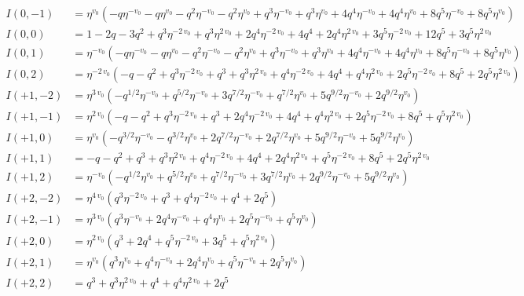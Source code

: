 \documentclass{article}
\begin{document}
\begin{align*}
I(0, -1) &= \eta^{v_{0}} \left( -q \eta^{-v_{0}} - q \eta^{v_{0}} - q^{2} \eta^{-v_{0}} - q^{2} \eta^{v_{0}} + q^{3} \eta^{-v_{0}} + q^{3} \eta^{v_{0}} + 4 q^{4} \eta^{-v_{0}} + 4 q^{4} \eta^{v_{0}} + 8 q^{5} \eta^{-v_{0}} + 8 q^{5} \eta^{v_{0}} \right) \\
I(0, 0) &= 1 - 2 q - 3 q^{2} + q^{3} \eta^{-2 \, v_{0}} + q^{3} \eta^{2 \, v_{0}} + 2 q^{4} \eta^{-2 \, v_{0}} + 4 q^{4} + 2 q^{4} \eta^{2 \, v_{0}} + 3 q^{5} \eta^{-2 \, v_{0}} + 12 q^{5} + 3 q^{5} \eta^{2 \, v_{0}} \\
I(0, 1) &= \eta^{-v_{0}} \left( -q \eta^{-v_{0}} - q \eta^{v_{0}} - q^{2} \eta^{-v_{0}} - q^{2} \eta^{v_{0}} + q^{3} \eta^{-v_{0}} + q^{3} \eta^{v_{0}} + 4 q^{4} \eta^{-v_{0}} + 4 q^{4} \eta^{v_{0}} + 8 q^{5} \eta^{-v_{0}} + 8 q^{5} \eta^{v_{0}} \right) \\
I(0, 2) &= \eta^{-2 \, v_{0}} \left( -q - q^{2} + q^{3} \eta^{-2 \, v_{0}} + q^{3} + q^{3} \eta^{2 \, v_{0}} + q^{4} \eta^{-2 \, v_{0}} + 4 q^{4} + q^{4} \eta^{2 \, v_{0}} + 2 q^{5} \eta^{-2 \, v_{0}} + 8 q^{5} + 2 q^{5} \eta^{2 \, v_{0}} \right) \\
I(+1, -2) &= \eta^{3 \, v_{0}} \left( -q^{1/2} \eta^{-v_{0}} + q^{5/2} \eta^{-v_{0}} + 3 q^{7/2} \eta^{-v_{0}} + q^{7/2} \eta^{v_{0}} + 5 q^{9/2} \eta^{-v_{0}} + 2 q^{9/2} \eta^{v_{0}} \right) \\
I(+1, -1) &= \eta^{2 \, v_{0}} \left( -q - q^{2} + q^{3} \eta^{-2 \, v_{0}} + q^{3} + 2 q^{4} \eta^{-2 \, v_{0}} + 4 q^{4} + q^{4} \eta^{2 \, v_{0}} + 2 q^{5} \eta^{-2 \, v_{0}} + 8 q^{5} + q^{5} \eta^{2 \, v_{0}} \right) \\
I(+1, 0) &= \eta^{v_{0}} \left( -q^{3/2} \eta^{-v_{0}} - q^{3/2} \eta^{v_{0}} + 2 q^{7/2} \eta^{-v_{0}} + 2 q^{7/2} \eta^{v_{0}} + 5 q^{9/2} \eta^{-v_{0}} + 5 q^{9/2} \eta^{v_{0}} \right) \\
I(+1, 1) &= -q - q^{2} + q^{3} + q^{3} \eta^{2 \, v_{0}} + q^{4} \eta^{-2 \, v_{0}} + 4 q^{4} + 2 q^{4} \eta^{2 \, v_{0}} + q^{5} \eta^{-2 \, v_{0}} + 8 q^{5} + 2 q^{5} \eta^{2 \, v_{0}} \\
I(+1, 2) &= \eta^{-v_{0}} \left( -q^{1/2} \eta^{v_{0}} + q^{5/2} \eta^{v_{0}} + q^{7/2} \eta^{-v_{0}} + 3 q^{7/2} \eta^{v_{0}} + 2 q^{9/2} \eta^{-v_{0}} + 5 q^{9/2} \eta^{v_{0}} \right) \\
I(+2, -2) &= \eta^{4 \, v_{0}} \left( q^{3} \eta^{-2 \, v_{0}} + q^{3} + q^{4} \eta^{-2 \, v_{0}} + q^{4} + 2 q^{5} \right) \\
I(+2, -1) &= \eta^{3 \, v_{0}} \left( q^{3} \eta^{-v_{0}} + 2 q^{4} \eta^{-v_{0}} + q^{4} \eta^{v_{0}} + 2 q^{5} \eta^{-v_{0}} + q^{5} \eta^{v_{0}} \right) \\
I(+2, 0) &= \eta^{2 \, v_{0}} \left( q^{3} + 2 q^{4} + q^{5} \eta^{-2 \, v_{0}} + 3 q^{5} + q^{5} \eta^{2 \, v_{0}} \right) \\
I(+2, 1) &= \eta^{v_{0}} \left( q^{3} \eta^{v_{0}} + q^{4} \eta^{-v_{0}} + 2 q^{4} \eta^{v_{0}} + q^{5} \eta^{-v_{0}} + 2 q^{5} \eta^{v_{0}} \right) \\
I(+2, 2) &= q^{3} + q^{3} \eta^{2 \, v_{0}} + q^{4} + q^{4} \eta^{2 \, v_{0}} + 2 q^{5} \\
\end{align*}
\end{document}
